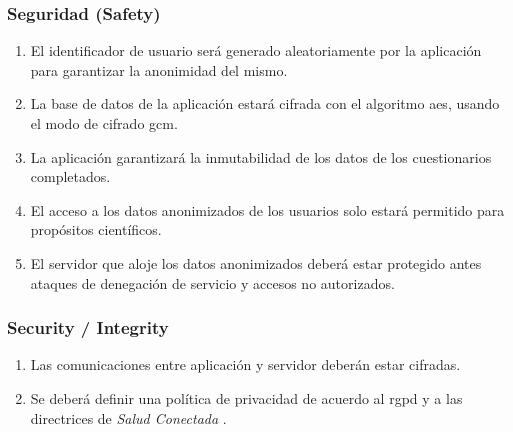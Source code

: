         \subsubsection{Seguridad (Safety)}
            \begin{enumerate}[resume, label=\textbf{\texttt{RNF-\arabic*}}]
                \item \label{req:no_funcionales:id_anonimo} El identificador de usuario será generado aleatoriamente por la aplicación para garantizar la anonimidad del mismo.  
                \item \label{req:no_funcionales:cifrado_bd} La base de datos de la aplicación estará cifrada con el algoritmo \gls{aes}, usando el modo de cifrado \gls{gcm}.
                \item \label{req:no_funcionales:inmutabilidad} La aplicación garantizará la inmutabilidad de los datos de los cuestionarios completados.
                \item \label{req:no_funcionales:datos_solo_cientificos} El acceso a los datos anonimizados de los usuarios solo estará permitido para propósitos científicos.
                \item \label{req:no_funcionales:ddos} El servidor que aloje los datos anonimizados deberá estar protegido antes ataques de denegación de servicio y accesos no autorizados.
            \end{enumerate}
        \subsubsection{Security / Integrity}
            \begin{enumerate}[resume, label=\textbf{\texttt{RNF-\arabic*}}]
                \item \label{req:no_funcionales:cifrado_comunicaciones} Las comunicaciones entre aplicación y servidor deberán estar cifradas.
                \item \label{req:no_funcionales:politica_privacidad} Se deberá definir una política de privacidad de acuerdo al \gls{rgpd} \cite{publications_office_of_the_european_union_reglamento_nodate} y a las directrices de \textit{Salud Conectada} \cite{google_preguntas_nodate}.
            \end{enumerate}
